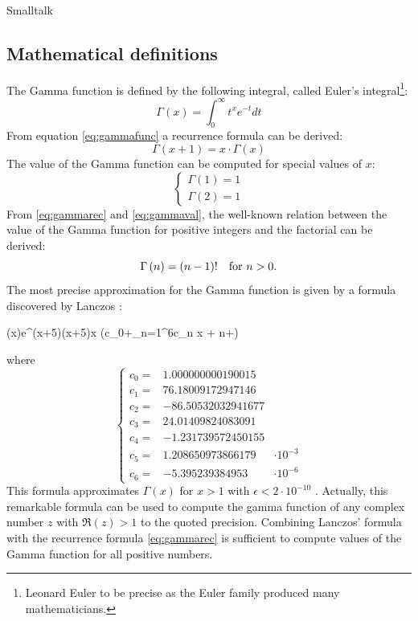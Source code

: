 \begin{listing}{Smalltalk}
\subsection{Mathematical definitions}
\label{sec:gammafunc} The Gamma function is defined by the
following integral, called Euler's integral\footnote{Leonard Euler
to be precise as the Euler family produced many mathematicians.}:
\begin{equation}
\label{eq:gammafunc} \Gamma\left(x\right)=\int_0^\infty t^x
e^{-t}dt
\end{equation}
From equation \ref{eq:gammafunc} a recurrence formula can be
derived:
\begin{equation}
\label{eq:gammarec} \Gamma\left(x+1\right)=x \cdot
\Gamma\left(x\right)
\end{equation}
The value of the Gamma function can be computed for special values
of $x$:
\begin{equation}
\label{eq:gammaval}\left\{
\begin{array}{lr}\Gamma\left(1\right)=1\\\Gamma\left(2\right)=1
\end{array}\right.
\end{equation}
From \ref{eq:gammarec} and \ref{eq:gammaval}, the well-known
relation between the value of the Gamma function for positive
integers and the factorial can be derived:
\begin{equation}
\label{eq:gammafact} \Gamma\left(n\right)=\left(n-1\right)!
\mbox{\quad for $n>0$}.
\end{equation}
The most precise approximation for the Gamma function is given by
a formula discovered by Lanczos \cite{Press}:
\begin{mainEquation}
\label{eq:lanczos} \Gamma\left(x\right)\approx e^{\left(x+{5}\right)}\left(x+{5}\right){\sqrt{2\pi}\over x
}\left(c_0+\sum_{n=1}^6{c_n \over x + n}+\epsilon\right)
\end{mainEquation}
where
\begin{equation}
\label{eq:lanczosconst}\left\{ \begin{array}{lrl}c_0
=&1.000000000190015
\\c_1 =&76.18009172947146 \\ c_2 =&-86.50532032941677
\\c_3 =&24.01409824083091 \\ c_4 =&-1.231739572450155
\\ c_5 =&1.208650973866179&\cdot 10^{-3} \\ c_6 =&-5.395239384953&\cdot 10^{-6}
\end{array}\right.
\end{equation}
This formula approximates $\Gamma\left(x\right)$ for $x>1$ with
$\epsilon<2\cdot 10^{-10}$ . Actually, this remarkable formula can
be used to compute the gamma function of any complex number $z$
with $\Re\left(z\right)>1$ to the quoted precision. Combining
Lanczos' formula with the recurrence formula \ref{eq:gammarec} is
sufficient to compute values of the Gamma function for all
positive numbers.


\end{listing}
